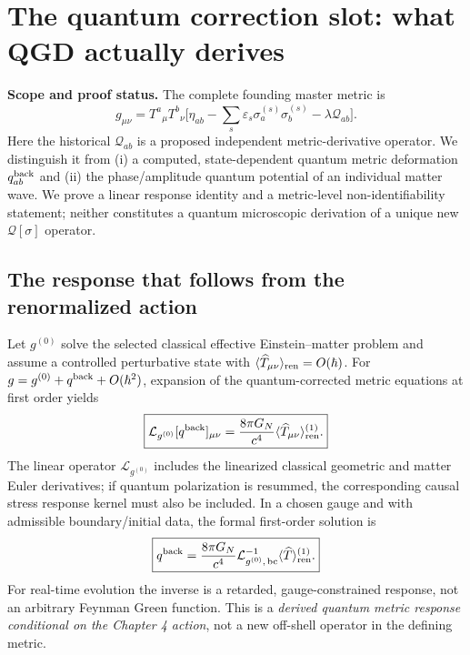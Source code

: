 \documentclass[11pt,a4paper]{article}
\begin{document}
\section{The quantum correction slot: what QGD actually derives}\label{sec:qgd138}
\noindent\textbf{Scope and proof status.} The complete founding master metric is
\begin{equation}\label{eq:qgd138-master}
 \boxed{g_{\mu\nu}=T^a{}_{\mu}T^b{}_{\nu}
 \biggl[\eta_{ab}-\sum_s\varepsilon_s\sigma_a^{(s)}\sigma_b^{(s)}
 -\lambda\mathcal Q_{ab}\biggr].}
\end{equation}
Here the historical $\mathcal Q_{ab}$ is a proposed independent
metric-derivative operator. We distinguish it from (i) a computed,
state-dependent quantum metric deformation $q_{ab}^{\rm back}$ and
(ii) the phase/amplitude quantum potential of an individual matter wave.
We prove a linear response identity and a metric-level non-identifiability
statement; neither constitutes a quantum microscopic derivation of a
unique new $\mathcal Q[\sigma]$ operator.

\subsection{The response that follows from the renormalized action}
Let $g^{(0)}$ solve the selected classical effective Einstein--matter
problem and assume a controlled perturbative state with
$\langle\widehat T_{\mu\nu}\rangle_{\rm ren}=O(\hbar)$.
For $g=g^{(0)}+q^{\rm back}+O(\hbar^2)$, expansion of the
quantum-corrected metric equations at first order yields
\begin{equation}\label{eq:qgd138-eom}
 \boxed{\mathcal L_{g^{(0)}}[q^{\rm back}]_{\mu\nu}
 =\frac{8\pi G_N}{c^4}\langle\widehat T_{\mu\nu}\rangle_{\rm ren}^{(1)}.}
\end{equation}
The linear operator $\mathcal L_{g^{(0)}}$ includes the linearized
classical geometric and matter Euler derivatives; if quantum
polarization is resummed, the corresponding causal stress response
kernel must also be included. In a chosen gauge and with admissible
boundary/initial data, the formal first-order solution is
\begin{equation}\label{eq:qgd138-green}
 \boxed{q^{\rm back}=\frac{8\pi G_N}{c^4}
 \mathcal L_{g^{(0)},\,\rm bc}^{-1}
 \langle\widehat T\rangle_{\rm ren}^{(1)}.}
\end{equation}
For real-time evolution the inverse is a retarded, gauge-constrained
response, not an arbitrary Feynman Green function. This is a
\emph{derived quantum metric response conditional on the Chapter 4 action},
not a new off-shell operator in the defining metric.
\end{document}
